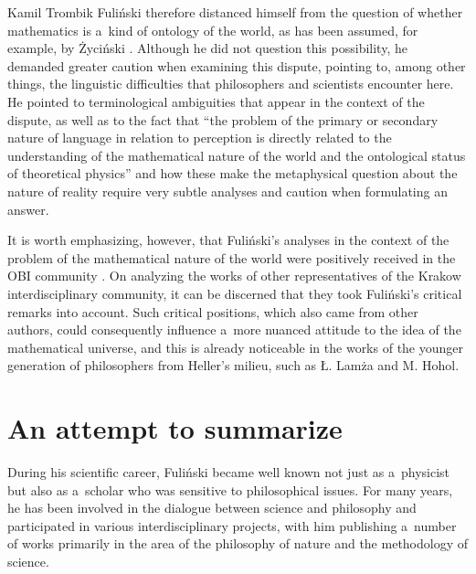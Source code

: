 \begin{artengenv}{Kamil Trombik}
Fuliński therefore distanced himself from the question of whether mathematics is a~kind of ontology of the world, as has been assumed, for example, by Życiński 
\parencite*[][]{zycinski_swiat_2013}. %
 Although he did not question this possibility, he demanded greater caution when examining this dispute, pointing to, among other things, the linguistic difficulties that philosophers and scientists encounter here. He pointed to terminological ambiguities that appear in the context of the dispute, as well as to the fact that ``the problem of the primary or secondary nature of language in relation to perception is directly related to the understanding of the mathematical nature of the world and the ontological status of theoretical physics''
\parencites[][p.65]{janik_glos_1988}[see also][p.81]{heller_co_1991} %
 and how these make the metaphysical question about the nature of reality require very subtle analyses and caution when formulating an answer.



It is worth emphasizing, however, that Fuliński's analyses in the context of the problem of the mathematical nature of the world were positively received in the OBI community 
\parencite[e.g.,][pp.217–218]{zycinski_teizm_1988}. %
 On analyzing the works of other representatives of the Krakow interdisciplinary community, it can be discerned that they took Fuliński's critical remarks into account. Such critical positions, which also came from other authors, could consequently influence a~more nuanced attitude to the idea of the mathematical universe, and this is already noticeable in the works of the younger generation of philosophers from Heller's milieu, such as Ł. Lamża and M. Hohol.



\section*{An attempt to summarize}

During his scientific career, Fuliński became well known not just as a~physicist but also as a~scholar who was sensitive to philosophical issues. For many years, he has been involved in the dialogue between science and philosophy and participated in various interdisciplinary projects, with him publishing a~number of works primarily in the area of the philosophy of nature and the methodology of science.




\end{artengenv}
